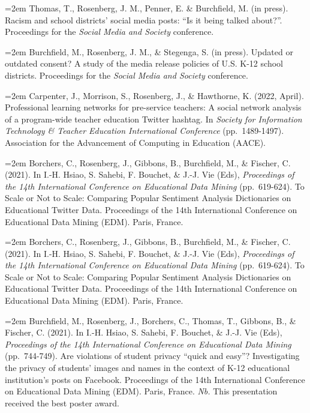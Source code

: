 \documentclass[
  14,
]{article}
\begin{document}
\hangindent=2em Thomas, T., Rosenberg, J. M., Penner, E. \& Burchfield,
M. (in press). Racism and school districts' social media posts: ``Is it
being talked about?''. Proceedings for the \emph{Social Media and
Society} conference.

\hangindent=2em Burchfield, M., Rosenberg, J. M., \& Stegenga, S. (in
press). Updated or outdated consent? A study of the media release
policies of U.S. K-12 school districts. Proceedings for the \emph{Social
Media and Society} conference.

\hangindent=2em Carpenter, J., Morrison, S., Rosenberg, J., \&
Hawthorne, K. (2022, April). Professional learning networks for
pre-service teachers: A social network analysis of a program-wide
teacher education Twitter hashtag. In \emph{Society for Information
Technology \& Teacher Education International Conference}
(pp.~1489-1497). Association for the Advancement of Computing in
Education (AACE).

\hangindent=2em Borchers, C., Rosenberg, J., Gibbons, B., Burchfield,
M., \& Fischer, C. (2021). In I.-H. Hsiao, S. Sahebi, F. Bouchet, \&
J.-J. Vie (Eds), \emph{Proceedings of the 14th International Conference
on Educational Data Mining} (pp.~619-624). To Scale or Not to Scale:
Comparing Popular Sentiment Analysis Dictionaries on Educational Twitter
Data. Proceedings of the 14th International Conference on Educational
Data Mining (EDM). Paris, France.

\hangindent=2em Borchers, C., Rosenberg, J., Gibbons, B., Burchfield,
M., \& Fischer, C. (2021). In I.-H. Hsiao, S. Sahebi, F. Bouchet, \&
J.-J. Vie (Eds), \emph{Proceedings of the 14th International Conference
on Educational Data Mining} (pp.~619-624). To Scale or Not to Scale:
Comparing Popular Sentiment Analysis Dictionaries on Educational Twitter
Data. Proceedings of the 14th International Conference on Educational
Data Mining (EDM). Paris, France.

\hangindent=2em Burchfield, M., Rosenberg, J., Borchers, C., Thomas, T.,
Gibbons, B., \& Fischer, C. (2021). In I.-H. Hsiao, S. Sahebi, F.
Bouchet, \& J.-J. Vie (Eds), \emph{Proceedings of the 14th International
Conference on Educational Data Mining} (pp.~744-749). Are violations of
student privacy ``quick and easy''? Investigating the privacy of
students' images and names in the context of K-12 educational
institution's posts on Facebook. Proceedings of the 14th International
Conference on Educational Data Mining (EDM). Paris, France. \emph{Nb.}
This presentation received the best poster award.
\end{document}
